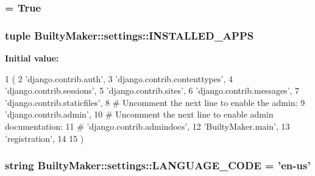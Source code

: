 \hypertarget{namespaceBuiltyMaker_1_1settings_a882fe92b777cea25285dd75a8d40c414}{
\subsubsection[{\-E\-M\-A\-I\-L\-\_\-\-U\-S\-E\-\_\-\-T\-L\-S}]{ = \-True}}\label{namespaceBuiltyMaker_1_1settings_a882fe92b777cea25285dd75a8d40c414}
\hypertarget{namespaceBuiltyMaker_1_1settings_a4914b3ed7ade29e8bdb72f5cb31b03e9}{
\subsubsection[{\-I\-N\-S\-T\-A\-L\-L\-E\-D\-\_\-\-A\-P\-P\-S}]{\setlength{\rightskip}{0pt plus 5cm}tuple {\bf \-Builty\-Maker\-::settings\-::\-I\-N\-S\-T\-A\-L\-L\-E\-D\-\_\-\-A\-P\-P\-S}}}\label{namespaceBuiltyMaker_1_1settings_a4914b3ed7ade29e8bdb72f5cb31b03e9}
{\bfseries \-Initial value\-:}
\begin{DoxyCode}
1 (
2     'django.contrib.auth',
3     'django.contrib.contenttypes',
4     'django.contrib.sessions',
5     'django.contrib.sites',
6     'django.contrib.messages',
7     'django.contrib.staticfiles',
8     # Uncomment the next line to enable the admin:
9     'django.contrib.admin',
10     # Uncomment the next line to enable admin documentation:
11     # 'django.contrib.admindocs',
12         'BuiltyMaker.main',
13         'registration',
14 
15 )
\end{DoxyCode}
\hypertarget{namespaceBuiltyMaker_1_1settings_a2e7d6b57fcf0b3ef9f49775d80cdcb55}{
\subsubsection[{\-L\-A\-N\-G\-U\-A\-G\-E\-\_\-\-C\-O\-D\-E}]{\setlength{\rightskip}{0pt plus 5cm}string {\bf \-Builty\-Maker\-::settings\-::\-L\-A\-N\-G\-U\-A\-G\-E\-\_\-\-C\-O\-D\-E} = 'en-\/us'}}\label{namespaceBuiltyMaker_1_1settings_a2e7d6b57fcf0b3ef9f49775d80cdcb55}
